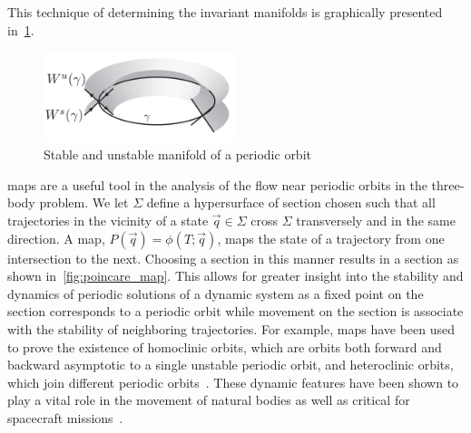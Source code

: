 \documentclass[preprint]{elsarticle}
\begin{document}
This technique of determining the invariant manifolds is graphically presented in~\cref{fig:invariant_manifold}.
\begin{figure}
	\centering
	\includegraphics[width=0.5\textwidth]{invariant_manifold}
	\caption{Stable and unstable manifold of a periodic orbit\label{fig:invariant_manifold}}
\end{figure}

\Poincare maps are a useful tool in the analysis of the flow near periodic orbits in the three-body problem.
We let \( \Sigma \) define a hypersurface of section chosen such that all trajectories in the vicinity of a state \( \vec{q} \in \Sigma \) cross \( \Sigma \) transversely and in the same direction.
A \Poincare map, \( P(\vec{q}) = \phi(T;\vec{q}) \), maps the state of a trajectory from one intersection to the next.
Choosing a section in this manner results in a \Poincare section as shown in~\cref{fig:poincare_map}.
This allows for greater insight into the stability and dynamics of periodic solutions of a dynamic system as a fixed point on the \Poincare section corresponds to a periodic orbit while movement on the section is associate with the stability of neighboring trajectories. 
For example, \Poincare maps have been used to prove the existence of homoclinic orbits, which are orbits both forward and backward asymptotic to a single unstable periodic orbit, and heteroclinic orbits, which join different periodic orbits~\cite{conley1968,koon2000b}.
These dynamic features have been shown to play a vital role in the movement of natural bodies as well as critical for spacecraft missions~\cite{gomez2001,lo1997}.
\end{document}
